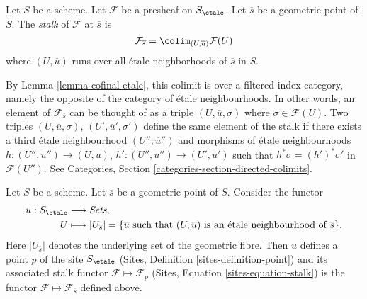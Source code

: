 \begin{definition}
\label{definition-stalk}
Let $S$ be a scheme.
Let $\mathcal{F}$ be a presheaf on $S_\etale$.
Let $\overline{s}$ be a geometric point of $S$.
The {\it stalk} of $\mathcal{F}$ at $\overline{s}$ is
$$
\mathcal{F}_{\overline{s}}
=
\colim_{(U, \overline{u})} \mathcal{F}(U)
$$
where $(U, \overline{u})$ runs over all \'etale
neighborhoods of $\overline{s}$ in $S$.
\end{definition}

\noindent
By Lemma \ref{lemma-cofinal-etale}, this colimit is over a filtered
index category, namely the opposite of the category of \'etale neighbourhoods.
In other words, an element of $\mathcal{F}_{\overline{s}}$ can be
thought of as a triple $(U, \overline{u}, \sigma)$ where
$\sigma \in \mathcal{F}(U)$. Two triples
$(U, \overline{u}, \sigma)$, $(U', \overline{u}', \sigma')$
define the same element of the stalk if there exists a third
\'etale neighbourhood $(U'', \overline{u}'')$ and morphisms of \'etale
neighbourhoods $h : (U'', \overline{u}'') \to (U, \overline{u})$,
$h' : (U'', \overline{u}'') \to (U', \overline{u}')$ such that
$h^*\sigma = (h')^*\sigma'$ in $\mathcal{F}(U'')$. See
Categories, Section \ref{categories-section-directed-colimits}.

\begin{lemma}
\label{lemma-stalk-gives-point}
Let $S$ be a scheme. Let $\overline{s}$ be a geometric point of $S$.
Consider the functor
\begin{align*}
u : S_\etale & \longrightarrow \textit{Sets}, \\
U & \longmapsto
|U_{\overline{s}}|
=
\{\overline{u} \text{ such that }(U, \overline{u})
\text{ is an \'etale neighbourhood of }\overline{s}\}.
\end{align*}
Here $|U_{\overline{s}}|$ denotes the underlying set of the geometric fibre.
Then $u$ defines a point $p$ of the site $S_\etale$
(Sites, Definition \ref{sites-definition-point})
and its associated stalk functor $\mathcal{F} \mapsto \mathcal{F}_p$
(Sites, Equation \ref{sites-equation-stalk})
is the functor $\mathcal{F} \mapsto \mathcal{F}_{\overline{s}}$
defined above.
\end{lemma}

